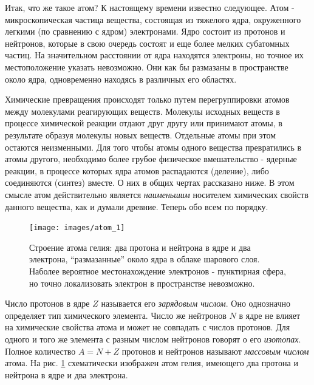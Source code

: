 Итак, что же такое атом? К настоящему времени известно следующее.
Атом - микроскопическая частица вещества, состоящая из тяжелого ядра, окруженного легкими (по сравнению с ядром) электронами.
Ядро состоит из протонов и нейтронов, которые в свою очередь состоят и еще более мелких субатомных частиц.
На значительном расстоянии от ядра находятся электроны, но точное их местоположение указать невозможно.
Они как бы размазаны в пространстве около ядра, одновременно находясь в различных его областях.

Химические превращения происходят только путем перегруппировки атомов между молекулами реагирующих веществ.
Молекулы исходных веществ в процессе химической реакции отдают друг другу или принимают атомы, в результате образуя молекулы новых веществ. 
Отдельные атомы при этом остаются неизменными.
Для того чтобы атомы одного вещества превратились в атомы другого, необходимо более грубое физическое вмешательство - ядерные реакции, в процессе которых ядра атомов распадаются (деление), либо соединяются (синтез) вместе.
О них в общих чертах рассказано ниже.
В этом смысле атом действительно является \textit{наименьшим} носителем химических свойств данного вещества, как и думали древние.
Теперь обо всем по порядку.

\begin{figure}[t!]
   \centering
   \texttt{[image: images/atom\_1]}
   \caption{Строение атома гелия: два протона и нейтрона в ядре и два электрона, ``размазанные'' около ядра в облаке шарового слоя. Наболее вероятное местонахождение электронов - пунктирная сфера, но точно локализовать электрон в пространстве невозможно.}
   \label{fig:atom_1}
\end{figure}

Число протонов в ядре $Z$ называется его \textit{зарядовым числом}.
Оно однозначно определяет тип химического элемента. 
Число же нейтронов $N$ в ядре  не влияет на химические свойства атома и может не совпадать с числов протонов.
Для одного и того же элемента с разным числом нейтронов говорят о его \textit{изотопах}.
Полное количество $A = N + Z$ протонов и нейтронов называют \textit{массовым числом} атома.
На рис. \ref{fig:atom_1} схематически изображен атом гелия, имеющего два протона и нейтрона в ядре и два электрона.

